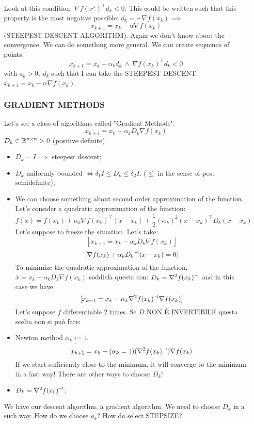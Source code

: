 Look at this condition: $\nabla{f(x^\star)}^\top d_k < 0$. This could be written such that this property is the most negative possible: $d_k = -\nabla{f(x_k)} \implies$
\[
	x_{k+1} = x_k -\alpha\nabla{f(x_k)}
\]
(STEEPEST DESCENT ALGORITHM).
Again we don't know about the convergence. We can do something more general. We can create sequence of points:
\[
	x_{k+1} = x_k +\alpha_kd_k\ \land\ \nabla{f(x_k)}^\top d_k < 0
\]
with $a_k > 0,\ d_k$ such that I can take the STEEPEST DESCENT: $x_{k+1} = x_k -\alpha\nabla{f(x_k)}$.

\subsubsection{GRADIENT METHODS}

Let's see a class of algorithms called "Gradient Methods".
\[
	x_{k+1} = x_k - \alpha_k D_k\nabla{f(x_k)}
\]
$D_k\in\mathbb{R}^{n\times n} > 0$ (positive definite).

\begin{itemize}
\item $D_k = I \implies$ steepest descent;
\item $D_k$ uniformly bounded $\iff \delta_1I \leq D_k \leq \delta_2I$. ($\leq$ in the sense of pos. semidefinite);
\item We can choose something about second order approximation of the function. Let's consider a quadratic approximation of the function:
\[
	f(x) = f(x_k) + \alpha_k\nabla{f(x_k)}^\top (x-x_k) + \frac{1}{2}(\alpha_k)^2(x-x_k)^\top D_k(x-x_k)
\]
Let's suppose to freeze the situation. Let's take:
\[
	[x_{k+1} = x_k -\alpha_kD_k\nabla{f(x_k)}]
\]
\[
	[\nabla{f(x_k)} + \alpha_k\inv{D_k}(x-x_k) = 0]
\]
To minimize the quadratic approximation of the function, $\bar{x} = x_k - \alpha_kD_k\nabla{f(x_k)}$ soddisfa questa con: $D_k = \inv{\nabla^2{f(x_k)}}$ and in this case we have:
\[
	[x_{k+1} = x_k - \alpha_k\inv{\nabla^2{f(x_k)}}\nabla{f(x_k)}]
\]
Let's suppose $f$ differentiable 2 times. Se $D$ NON \`E INVERTIBILE questa scelta non si può fare:
\item{Newton method} $\underline{\alpha_k := 1}$.
\[
	x_{k+1} = x_k - (\alpha_k=1)(\inv{\nabla^2{f(x_k)}})\nabla{f(x_k)}
\]
If we start sufficiently close to the minimum, it will converge to the minimum in a fast way! There are other ways to choose $D_k$!
\item $D_k = \inv{\nabla^2{f(x_0)}}$;
\end{itemize}

We have our descent algorithm, a gradient algorithm. We need to choose $D_k$ in a such way. How do we choose $a_k$? How do select STEPSIZE?

